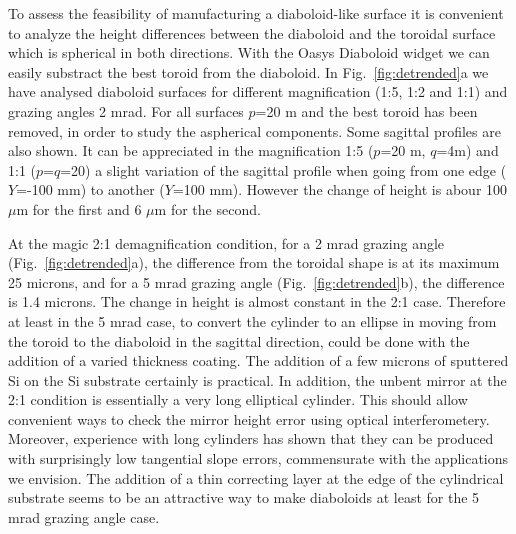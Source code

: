 \documentclass{iucr}              %
\begin{document}

To assess the feasibility of manufacturing a diaboloid-like surface it is convenient to analyze the height differences between the diaboloid and the toroidal surface which is spherical in both directions. With the Oasys Diaboloid widget we can easily substract the best toroid from the diaboloid. In Fig.~\ref{fig:detrended}a we have analysed diaboloid surfaces for different magnification (1:5, 1:2 and 1:1) and grazing angles 2 mrad. For all surfaces $p$=20 m and the best toroid has been removed, in order to study the aspherical components. Some sagittal profiles are also shown. It can be appreciated in the magnification 1:5 ($p$=20 m, $q$=4m) and 1:1 ($p$=$q$=20) a slight variation of the sagittal profile when going from one edge ($Y$=-100 mm) to another ($Y$=100 mm). However the change of height is abour 100 $\mu$m for the first and 6 $\mu$m for the second. 


At the magic 2:1 demagnification condition, for a 2 mrad grazing angle (Fig.~\ref{fig:detrended}a), the difference from the toroidal shape is at its maximum 25 microns, and for a 5 mrad grazing angle (Fig.~\ref{fig:detrended}b), the difference is 1.4 microns.  The change in height is almost constant in the 2:1 case.  Therefore at least in the 5 mrad case, to convert the cylinder to an ellipse in moving from the toroid to the diaboloid in the sagittal direction, could be done with the addition of a varied thickness coating.  The addition of a few microns of sputtered Si on the Si substrate certainly is practical.  In addition, the unbent mirror at the 2:1 condition is essentially a very long elliptical cylinder.  This should allow convenient ways to check the mirror height error using optical interferometery.  Moreover, experience with long cylinders has shown that they can be produced with surprisingly low tangential slope errors, commensurate with the applications we envision.  The addition of a thin correcting layer at the edge of the cylindrical substrate seems to be an attractive way to make diaboloids at least for the 5 mrad grazing angle case. 
\end{document}
